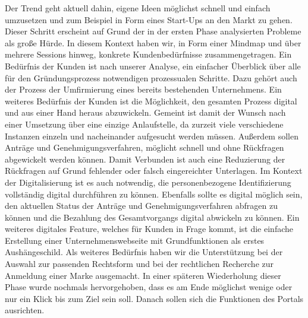 Der Trend geht aktuell dahin, eigene Ideen möglichst schnell und einfach umzusetzen und zum Beispiel in Form eines Start-Ups an den Markt zu gehen. Dieser Schritt erscheint auf Grund der in der ersten Phase analysierten Probleme als große Hürde. In diesem Kontext haben wir, in Form einer Mindmap und über mehrere Sessions hinweg, konkrete Kundenbedürfnisse zusammengetragen.
Ein Bedürfnis der Kunden ist nach unserer Analyse, ein einfacher Überblick über alle für den Gründungsprozess notwendigen prozessualen Schritte. Dazu gehört auch der Prozess der Umfirmierung eines bereits bestehenden Unternehmens.
Ein weiteres Bedürfnis der Kunden ist die Möglichkeit, den gesamten Prozess digital und aus einer Hand heraus abzuwickeln. Gemeint ist damit der Wunsch nach einer Umsetzung über eine einzige Anlaufstelle, da zurzeit viele verschiedene Instanzen einzeln und nacheinander aufgesucht werden müssen. Außerdem sollen Anträge und Genehmigungsverfahren, möglicht schnell und ohne Rückfragen abgewickelt werden können. Damit Verbunden ist auch eine Reduzierung der Rückfragen auf Grund fehlender oder falsch eingereichter Unterlagen.
Im Kontext der Digitalisierung ist es auch notwendig, die personenbezogene Identifizierung vollständig digital durchführen zu können. Ebenfalls sollte es digital möglich sein, den aktuellen Status der Anträge und Genehmigungsverfahren abfragen zu können und die Bezahlung des Gesamtvorgangs digital abwickeln zu können. Ein weiteres digitales Feature, welches für Kunden in Frage kommt, ist die einfache Erstellung einer Unternehmenswebseite mit Grundfunktionen als erstes Aushängeschild.
Als weiteres Bedürfnis haben wir die Unterstützung bei der Auswahl zur passenden Rechtsform und bei der rechtlichen Recherche zur Anmeldung einer Marke ausgemacht.
In einer späteren Wiederholung dieser Phase wurde nochmals hervorgehoben, dass es am Ende möglichst wenige oder nur ein Klick bis zum Ziel sein soll. Danach sollen sich die Funktionen des Portals ausrichten.